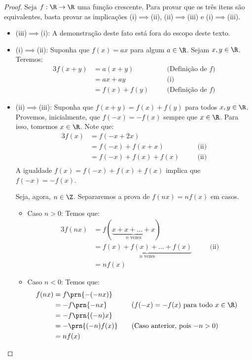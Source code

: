 \begin{proof}
  Seja $f:\R \to \R$ uma função crescente.
  Para provar que os três itens são equivalentes, basta provar as implicações (i)$\implies$(ii),  
  (ii)$\implies$(iii) e (i)$\implies$(iii).

  \begin{itemize}
    \item (iii)$\implies$(i): A demonstração deste fato está fora do escopo deste texto.
    \item (i)$\implies$(ii): Suponha que $f(x)=ax$ para algum $a \in \R$. Sejam $x,y\in\R$.
    Teremos:
    \begin{alignat*}{3}
        f(x+y) &= a(x+y) && \quad\text{(Definição de $f$)}\\
        &= ax+ay && \quad\text{(i)}\\
        &= f(x)+f(y) && \quad\text{(Definição de $f$)}
    \end{alignat*}

    \item (ii)$\implies$(iii): Suponha que $f(x+y)=f(x)+f(y)$ para todos $x,y\in\R$.
    Provemos, inicialmente, que $f(-x) = -f(x)$ sempre que $x\in\R$. 
    Para isso, tomemos $x\in\R$.
    Note que:
    \begin{alignat*}{3}
      f(x) &= f(-x+2x)\\
      &= f(-x)+f(x+x) && \quad\text{(ii)}\\
      &= f(-x)+f(x)+f(x) && \quad\text{(ii)}\\
    \end{alignat*}
    A igualdade $f(x) = f(-x)+f(x)+f(x)$ implica que $f(-x) = -f(x)$.

    Seja, agora, $n\in\Z$. Separaremos a prova de $f(nx)=nf(x)$ em casos.
    \begin{itemize}
      \item Caso $n>0$: Temos que:
      \begin{alignat*}{3}
        f(nx) &= f(\underbrace{x+x+\dots+x}_{\text{$n$ vezes}}) \\
        &= \underbrace{f(x)+f(x)+\dots+f(x)}_{\text{$n$ vezes}} && \quad\text{(ii)}\\
        &= nf(x)
      \end{alignat*}

      \item Caso $n<0$: Temos que:
      \begin{alignat*}{3}
        f(nx)&=f\prn{-(-nx)} \\
        &= -f\prn{-nx} && \quad\text{($f(-x) = -f(x)$ para todo $x \in \R$)}\\
        &= -f\prn{(-n)x} \\
        &= -\prn{ (-n)f(x)} && \quad\text{(Caso anterior, pois $-n>0$)}\\
        &= nf(x)
      \end{alignat*}
      

\end{itemize}
\end{itemize}
\end{proof}
